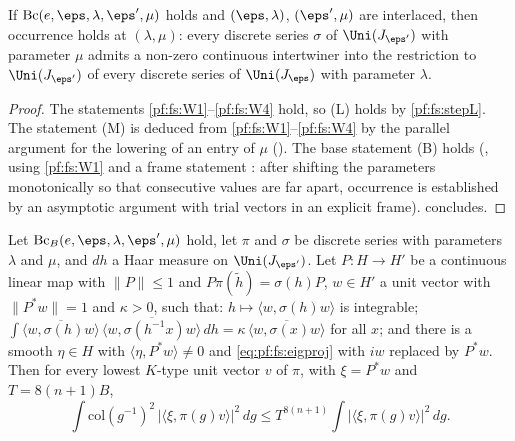 \begin{theorem}[Occurrence]\label{pf:fs:occ}
If $\mathrm{Bc}(e,\eps,\lambda,\eps',\mu)$ holds and $(\eps,\lambda)$, $(\eps',\mu)$ are interlaced, then occurrence holds at $(\lambda,\mu)$: every
discrete series $\sigma$ of $\Uni(J_{\eps'})$ with parameter $\mu$ admits a non-zero continuous intertwiner into the restriction to
$\Uni(J_{\eps'})$ of every discrete series of $\Uni(J_\eps)$ with parameter $\lambda$.
\end{theorem}

\begin{proof}
The statements \ref{pf:fs:W1}--\ref{pf:fs:W4} hold, so (L) holds by \cref{pf:fs:stepL}. The statement (M) is deduced from \ref{pf:fs:W1}--\ref{pf:fs:W4} by
the parallel argument for the lowering of an entry of $\mu$ (). The base statement (B) holds
(, using \ref{pf:fs:W1} and a frame statement : after shifting
the parameters monotonically so that consecutive values are far apart, occurrence is established by an asymptotic argument with trial vectors in
an explicit frame).  concludes.
\end{proof}

\begin{proposition}\label{pf:fs:moment}
Let $\mathrm{Bc}_B(e,\eps,\lambda,\eps',\mu)$ hold, let $\pi$ and $\sigma$ be discrete series with parameters $\lambda$ and $\mu$, and $dh$ a Haar measure on
$\Uni(J_{\eps'})$. Let $P\colon H\to H'$ be a continuous linear map with $\|P\|\le1$ and $P\pi(\tilde h)=\sigma(h)P$, $w\in H'$ a unit vector with
$\|P^*w\|=1$ and $\kappa>0$, such that: $h\mapsto\langle w,\sigma(h)w\rangle$ is integrable; $\int\overline{\langle w,\sigma(h)w\rangle}\,
\overline{\langle w,\sigma(h^{-1}x)w\rangle}\,dh=\kappa\,\overline{\langle w,\sigma(x)w\rangle}$ for all $x$; and there is a smooth $\eta\in H$ with
$\langle\eta,P^*w\rangle\ne0$ and \eqref{eq:pf:fs:eigproj} with $i w$ replaced by $P^*w$. Then for every lowest $K$-type unit vector $v$ of $\pi$, with
$\xi=P^*w$ and $T=8(n+1)B$,
\[
\int\mathrm{col}(g^{-1})^2\,|\langle\xi,\pi(g)v\rangle|^2\,dg\le T^{8(n+1)}\int|\langle\xi,\pi(g)v\rangle|^2\,dg .
\]
\end{proposition}

